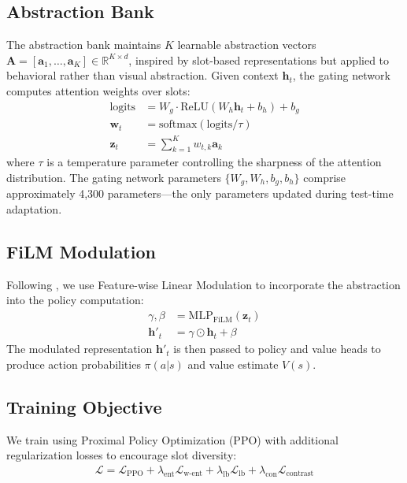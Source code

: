 \documentclass{article}
\newcommand{\R}{\mathbb{R}}
\newcommand{\bh}{\mathbf{h}}
\newcommand{\bz}{\mathbf{z}}
\newcommand{\bw}{\mathbf{w}}
\newcommand{\bA}{\mathbf{A}}
\begin{document}
\subsection{Abstraction Bank}

The abstraction bank maintains $K$ learnable abstraction vectors $\bA = [\mathbf{a}_1, \ldots, \mathbf{a}_K] \in \R^{K \times d}$, inspired by slot-based representations \citep{locatello2020object} but applied to behavioral rather than visual abstraction. Given context $\bh_t$, the gating network computes attention weights \citep{bahdanau2015neural, vaswani2017attention} over slots:
\begin{align}
    \text{logits} &= W_g \cdot \text{ReLU}(W_h \bh_t + b_h) + b_g \\
    \bw_t &= \text{softmax}(\text{logits} / \tau) \\
    \bz_t &= \sum_{k=1}^K w_{t,k} \mathbf{a}_k
\end{align}
where $\tau$ is a temperature parameter controlling the sharpness of the attention distribution. The gating network parameters $\{W_g, W_h, b_g, b_h\}$ comprise approximately 4,300 parameters---the only parameters updated during test-time adaptation.

\subsection{FiLM Modulation}

Following \citet{perez2018film}, we use Feature-wise Linear Modulation to incorporate the abstraction into the policy computation:
\begin{align}
    \gamma, \beta &= \text{MLP}_{\text{FiLM}}(\bz_t) \\
    \bh'_t &= \gamma \odot \bh_t + \beta
\end{align}
The modulated representation $\bh'_t$ is then passed to policy and value heads to produce action probabilities $\pi(a|s)$ and value estimate $V(s)$.

\subsection{Training Objective}

We train using Proximal Policy Optimization (PPO) \citep{schulman2017proximal} with additional regularization losses to encourage slot diversity:
\begin{align}
    \mathcal{L} = \mathcal{L}_{\text{PPO}} + \lambda_{\text{ent}} \mathcal{L}_{\text{w-ent}} + \lambda_{\text{lb}} \mathcal{L}_{\text{lb}} + \lambda_{\text{con}} \mathcal{L}_{\text{contrast}}
\end{align}
\end{document}

